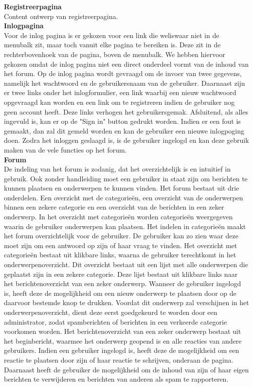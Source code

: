 \documentclass[a4paper,12pt]{article}
\begin{document}
{\bfseries Registreerpagina}\\
Content ontwerp van registreerpagina.\\

{\bfseries Inlogpagina}\\
Voor de inlog pagina is er gekozen voor een link die weliswaar niet in de menubalk zit, maar toch vanuit elke pagina te bereiken is. Deze zit in de rechterbovenhoek van de pagina, boven de menubalk. We hebben hiervoor gekozen omdat de inlog pagina niet een direct onderdeel vormt van de inhoud van het forum.
Op de inlog pagina wordt gevraagd om de invoer van twee gegevens, namelijk het wachtwoord en de gebruikersnaam van de gebruiker. Daarnaast zijn er twee links onder het inlogformulier, een link waarbij een nieuw wachtwoord opgevraagd kan worden en een link om te registreren indien de gebruiker nog geen account heeft. Deze links verhogen het gebruikersgemak.
Afsluitend, als alles ingevuld is, kan er op de "Sign in" button gedrukt worden. Indien er een fout is gemaakt, dan zal dit gemeld worden en kan de gebruiker een nieuwe inlogpoging doen. Zodra het inloggen geslaagd is, is de gebruiker ingelogd en kan deze gebruik maken van de vele functies op het forum.\\


{\bfseries Forum}\\
De indeling van het forum is zodanig, dat het overzichtelijk is en intuitief in gebruik. Ook zonder handleiding moet een gebruiker in staat zijn om berichten te kunnen plaatsen en onderwerpen te kunnen vinden.
Het forum bestaat uit drie onderdelen. Een overzicht met de categorie\"en, een overzicht van de onderwerpen binnen een zekere categorie en een overzicht van de berichten in een zeker onderwerp. In het overzicht met categorie\"en worden categorie\"en weergegeven waarin de gebruiker onderwerpen kan plaatsen. Het indelen in categorie\"en maakt het forum overzichtelijk voor de gebruiker. De gebruiker kan zo zien waar deze moet zijn om een antwoord op zijn of haar vraag te vinden. Het overzicht met categorie\"en bestaat uit klikbare links, waarna de gebruiker terechtkomt in het onderwerpenoverzicht. Dit overzicht bestaat uit een lijst met alle onderwerpen die geplaatst zijn in een zekere categorie. Deze lijst bestaat uit klikbare links naar het berichtenoverzicht van een zeker onderwerp. Wanneer de gebruiker ingelogd is, heeft deze de mogelijkheid om een nieuw onderwerp te plaatsen door op de daarvoor bestemde knop te drukken. Voordat dit onderwerp zal verschijnen in het onderwerpenoverzicht, dient deze eerst goedgekeurd te worden door een administrator, zodat spamberichten of berichten in een verkeerde categorie voorkomen worden. Het berichtenoverzicht van een zeker onderwerp bestaat uit het beginbericht, waarmee het onderwerp geopend is en alle reacties van andere gebruikers. Indien een gebruiker ingelogd is, heeft deze de mogelijkheid om een reactie te plaatsen door zijn of haar reactie te schrijven, onderaan de pagina. Daarnaast heeft de gebruiker de mogelijkheid om de inhoud van zijn of haar eigen berichten te verwijderen en berichten van anderen als spam te rapporteren.\\
\end{document}
